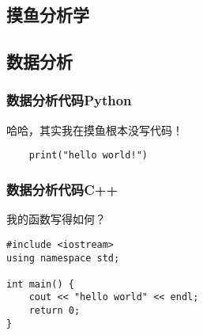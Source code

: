 
\begin{njuappendix}
\section{摸鱼分析学}
\subsection{数据分析}
\subsubsection{数据分析代码Python}
哈哈，其实我在摸鱼根本没写代码！
\begin{verbatim}
    print("hello world!")
\end{verbatim}

\subsubsection{数据分析代码C++}
我的函数写得如何？
\begin{verbatim}
#include <iostream>
using namespace std;

int main() {
    cout << "hello world" << endl;
    return 0;
}
\end{verbatim}
\end{njuappendix}